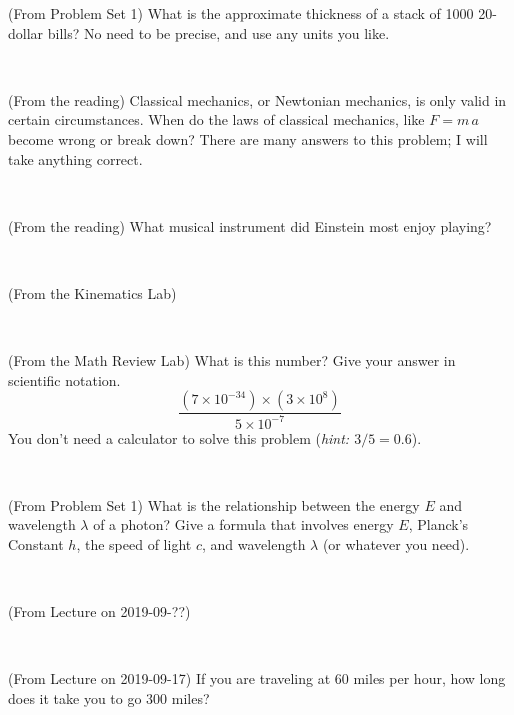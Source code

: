 \documentclass[12pt, letterpaper]{article}
\begin{document}
\begin{problem} (From Problem Set 1)
What is the approximate thickness of a stack of 1000 20-dollar bills?
No need to be precise, and use any units you like.
\end{problem}


\vfill ~

\begin{problem} (From the reading)
Classical mechanics, or Newtonian mechanics, is only valid in certain
circumstances. When do the laws of classical mechanics, like $F =
m\,a$ become wrong or break down? There are many answers to this
problem; I will take anything correct.
\end{problem}


\vfill ~

\begin{problem} (From the reading)
What musical instrument did Einstein most enjoy playing?
\end{problem}


\vfill ~

\begin{problem} (From the Kinematics Lab)

\end{problem}


\vfill ~


\clearpage


\begin{problem} (From the Math Review Lab)
What is this number? Give your answer in scientific notation.
$$
\frac{(7\times10^{-34})\times(3\times10^8)}{5\times10^{-7}}
$$
You don't need a calculator to solve this problem (\textit{hint: $3/5=0.6$}).
\end{problem}


\vfill ~

\begin{problem} (From Problem Set 1)
What is the relationship between the energy $E$ and wavelength
$\lambda$ of a photon? Give a formula that involves energy $E$,
Planck's Constant $h$, the speed of light $c$, and wavelength
$\lambda$ (or whatever you need).
\end{problem}

\vfill ~

\begin{problem} (From Lecture on 2019-09-??)
\end{problem}


\vfill ~

\begin{problem} (From Lecture on 2019-09-17)
If you are traveling at 60 miles per hour, how long does
it take you to go 300 miles?
\end{problem}
\end{document}
